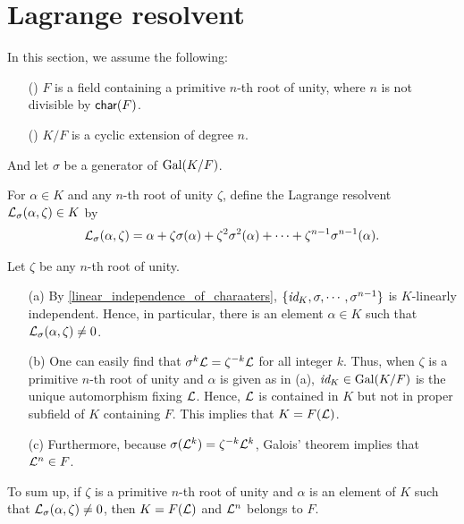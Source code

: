 \section{Lagrange resolvent}\label{Lagrange_resolvent}

In this section, we assume the following:
\begin{enumerate}
    \item[(\romannumeral 1)]
    {
        $F$ is a field containing a primitive $n$-th root of unity, where $n$ is not divisible by ${\textsf{char}({F})}$.
    }
    \item[(\romannumeral 2)]
    {
        $K/F$ is a cyclic extension of degree $n$.
    }
\end{enumerate}
And let $\sigma$ be a generator of ${\textrm{Gal}({K/F})}$.

\begin{defi}
    For $\alpha\in K$ and any $n$-th root of unity $\zeta$, define the Lagrange resolvent ${\mathcal{L}}_\sigma(\alpha, \zeta)\in K$ by
    \begin{align*}
        {\mathcal{L}}_\sigma(\alpha, \zeta)=\alpha+\zeta\sigma(\alpha)+\zeta^2\sigma^2(\alpha)+\cdots+\zeta^{n-1}\sigma^{n-1}(\alpha).
    \end{align*}
\end{defi}
\begin{obs}\label{the proof of cyclic->radical}
    Let $\zeta$ be any $n$-th root of unity.
    \begin{enumerate}
        \item[(a)]
        {
            By \cref{linear_independence_of_charaaters}, $\{\textit{id}_{K}, \sigma, \cdots, \sigma^{n-1}\}$ is $K$-linearly independent.
            Hence, in particular, there is an element $\alpha\in K$ such that ${\mathcal{L}}_\sigma(\alpha, \zeta)\neq 0$.
        }
        \item[(b)]
        {
            One can easily find that $\sigma^k{\mathcal{L}}=\zeta^{-k}{\mathcal{L}}$ for all integer $k$.
            Thus, when $\zeta$ is a primitive $n$-th root of unity and $\alpha$ is given as in (a), $\textit{id}_{K}\in{\textrm{Gal}({K/F})}$ is the unique automorphism fixing ${\mathcal{L}}$.
            Hence, ${\mathcal{L}}$ is contained in $K$ but not in proper subfield of $K$ containing $F$.
            This implies that $K=F({\mathcal{L}})$.
        }
        \item[(c)]
        {
            Furthermore, because $\sigma({\mathcal{L}}^k)=\zeta^{-k}{\mathcal{L}}^k$, Galois' theorem implies that ${\mathcal{L}}^n\in F$.
        }
    \end{enumerate}
    To sum up, if $\zeta$ is a primitive $n$-th root of unity and $\alpha$ is an element of $K$ such that ${\mathcal{L}}_\sigma(\alpha, \zeta)\neq 0$, then $K=F({\mathcal{L}})$ and ${\mathcal{L}}^n$ belongs to $F$.
\end{obs}